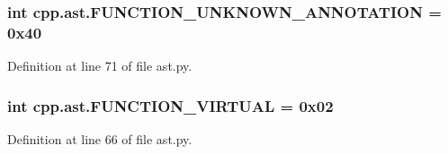 \subsubsection[{\texorpdfstring{F\+U\+N\+C\+T\+I\+O\+N\+\_\+\+U\+N\+K\+N\+O\+W\+N\+\_\+\+A\+N\+N\+O\+T\+A\+T\+I\+ON}{FUNCTION_UNKNOWN_ANNOTATION}}]{\setlength{\rightskip}{0pt plus 5cm}int cpp.\+ast.\+F\+U\+N\+C\+T\+I\+O\+N\+\_\+\+U\+N\+K\+N\+O\+W\+N\+\_\+\+A\+N\+N\+O\+T\+A\+T\+I\+ON = 0x40}\hypertarget{namespacecpp_1_1ast_a9d3ba548a6c733892e60c8accdc96639}{}\label{namespacecpp_1_1ast_a9d3ba548a6c733892e60c8accdc96639}


Definition at line 71 of file ast.\+py.

\subsubsection[{\texorpdfstring{F\+U\+N\+C\+T\+I\+O\+N\+\_\+\+V\+I\+R\+T\+U\+AL}{FUNCTION_VIRTUAL}}]{\setlength{\rightskip}{0pt plus 5cm}int cpp.\+ast.\+F\+U\+N\+C\+T\+I\+O\+N\+\_\+\+V\+I\+R\+T\+U\+AL = 0x02}\hypertarget{namespacecpp_1_1ast_a7d444baf6763d374aa4ef9c3f0e6d5b3}{}\label{namespacecpp_1_1ast_a7d444baf6763d374aa4ef9c3f0e6d5b3}


Definition at line 66 of file ast.\+py.

